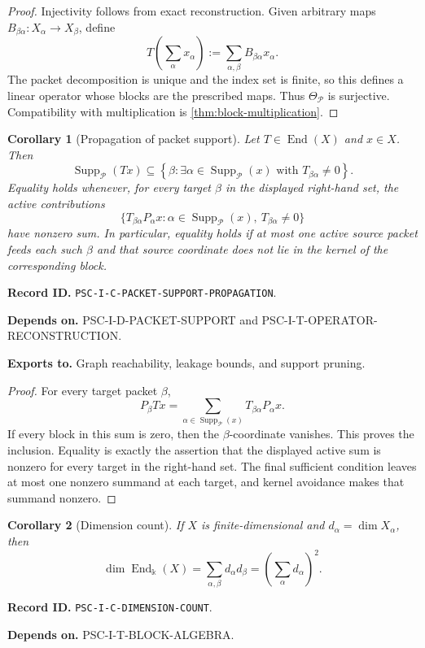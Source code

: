 \documentclass[11pt]{article}
\newtheorem{corollary}[corollary]{Corollary}
\theoremstyle{definition}
\theoremstyle{remark}
\newcommand{\bbk}{\Bbbk}
\newcommand{\Pcal}{\mathcal P}
\newcommand{\End}{\operatorname{End}}
\newcommand{\Supp}{\operatorname{Supp}}
\newcommand{\RecordID}[1]{\par\smallskip\noindent\begingroup\footnotesize\color{PSCGray}\raggedright\textbf{Record ID.} \nolinkurl{#1}.\par\endgroup}
\newcommand{\Depends}[1]{\par\noindent\begingroup\footnotesize\color{PSCGray}\raggedright\textbf{Depends on.} #1\par\endgroup}
\newcommand{\Exports}[1]{\par\noindent\begingroup\footnotesize\color{PSCGray}\raggedright\textbf{Exports to.} #1\par\endgroup}
\begin{document}
\begin{proof}
Injectivity follows from exact reconstruction.  Given arbitrary maps $B_{\beta\alpha}:X_\alpha\to X_\beta$, define
\[
T\left(\sum_\alpha x_\alpha\right)
:=
\sum_{\alpha,\beta}B_{\beta\alpha}x_\alpha.
\]
The packet decomposition is unique and the index set is finite, so this defines a linear operator whose blocks are the prescribed maps.  Thus $\Theta_{\Pcal}$ is surjective.  Compatibility with multiplication is \cref{thm:block-multiplication}.
\end{proof}



\begin{corollary}[Propagation of packet support]
\label{cor:packet-support-propagation}
Let \(T\in\End(X)\) and \(x\in X\).  Then
\[
\boxed{
\Supp_{\Pcal}(Tx)
\subseteq
\left\{\beta:\exists\alpha\in\Supp_{\Pcal}(x)
\text{ with }T_{\beta\alpha}\neq0\right\}.
}
\]
Equality holds whenever, for every target \(\beta\) in the displayed right-hand set, the active contributions
\[
\bigl\{T_{\beta\alpha}P_\alpha x:
\alpha\in\Supp_{\Pcal}(x),\ T_{\beta\alpha}\neq0\bigr\}
\]
have nonzero sum.  In particular, equality holds if at most one active source packet feeds each such \(\beta\) and that source coordinate does not lie in the kernel of the corresponding block.
\end{corollary}
\RecordID{PSC-I-C-PACKET-SUPPORT-PROPAGATION}
\Depends{PSC-I-D-PACKET-SUPPORT and PSC-I-T-OPERATOR-RECONSTRUCTION.}
\Exports{Graph reachability, leakage bounds, and support pruning.}

\begin{proof}
For every target packet \(\beta\),
\[
P_\beta Tx
=
\sum_{\alpha\in\Supp_{\Pcal}(x)}T_{\beta\alpha}P_\alpha x.
\]
If every block in this sum is zero, then the \(\beta\)-coordinate vanishes.  This proves the inclusion.  Equality is exactly the assertion that the displayed active sum is nonzero for every target in the right-hand set.  The final sufficient condition leaves at most one nonzero summand at each target, and kernel avoidance makes that summand nonzero.
\end{proof}


\begin{corollary}[Dimension count]
\label{cor:dimension-count}
If $X$ is finite-dimensional and $d_\alpha=\dim X_\alpha$, then
\[
\dim\End_{\bbk}(X)
=
\sum_{\alpha,\beta}d_\alpha d_\beta
=
\left(\sum_\alpha d_\alpha\right)^2.
\]
\end{corollary}
\RecordID{PSC-I-C-DIMENSION-COUNT}
\Depends{PSC-I-T-BLOCK-ALGEBRA.}
\end{document}
